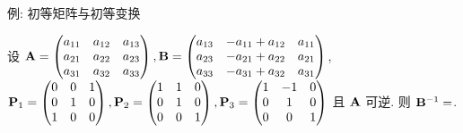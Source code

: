 \begin{frame}{例: 初等矩阵与初等变换}
	\onslide<+->
	\begin{exercise}
		设 ${\mathbf{A}}=\begin{pmatrix}
			a_{11}&a_{12}&a_{13}\\
			a_{21}&a_{22}&a_{23}\\
			a_{31}&a_{32}&a_{33}
		\end{pmatrix},{\mathbf{B}}=\begin{pmatrix}
			a_{13}&-a_{11}+a_{12}&a_{11}\\
			a_{23}&-a_{21}+a_{22}&a_{21}\\
			a_{33}&-a_{31}+a_{32}&a_{31}
		\end{pmatrix}$,\\
		${\mathbf{P}}_1=\begin{pmatrix}
			0&0&1\\0&1&0\\1&0&0
		\end{pmatrix},{\mathbf{P}}_2=\begin{pmatrix}
			1&1&0\\0&1&0\\0&0&1
		\end{pmatrix},{\mathbf{P}}_3=\begin{pmatrix}
			1&-1&0\\0&1&0\\0&0&1
		\end{pmatrix}$ 且 ${\mathbf{A}}$ 可逆.
		则 ${\mathbf{B}}^{-1}=$.
	\end{exercise}
\end{frame}


